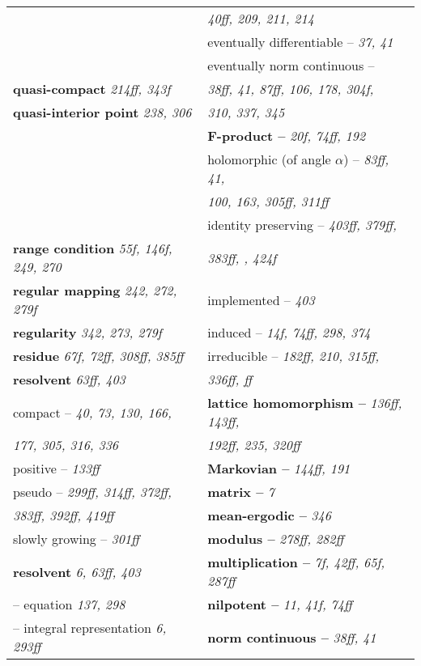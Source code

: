 \begin{longtable}{p{}p{}}
& \quad\quad \textit{40ff, 209, 211, 214} \\
& \quad eventually differentiable -- \textit{37, 41} \\
& \quad eventually norm continuous -- \\
\textbf{quasi-compact} \textit{214ff, 343f} & \quad\quad \textit{38ff, 41, 87ff, 106, 178, 304f,} \\
\textbf{quasi-interior point} \textit{238, 306} & \quad\quad \textit{310, 337, 345} \\
& \textbf{F-product --} \textit{20f, 74ff, 192} \\
& \quad holomorphic (of angle $ \alpha $) -- \textit{83ff, 41,} \\
& \quad\quad \textit{100, 163, 305ff, 311ff} \\
& \quad identity preserving -- \textit{403ff, 379ff,} \\
\textbf{range condition} \textit{55f, 146f, 249, 270} & \quad\quad \textit{383ff, , 424f} \\
\textbf{regular mapping} \textit{242, 272, 279f} & \quad implemented -- \textit{403} \\
\textbf{regularity} \textit{342, 273, 279f} & \quad induced -- \textit{14f, 74ff, 298, 374} \\
\textbf{residue} \textit{67f, 72ff, 308ff, 385ff} & \quad irreducible -- \textit{182ff, 210, 315ff,} \\
\textbf{resolvent} \textit{63ff, 403} & \quad\quad \textit{336ff, ff} \\
\quad compact -- \textit{40, 73, 130, 166,} & \textbf{lattice homomorphism --} \textit{136ff, 143ff,} \\
\quad\quad \textit{177, 305, 316, 336} & \quad\quad \textit{192ff, 235, 320ff} \\
\quad positive -- \textit{133ff} & \textbf{Markovian --} \textit{144ff, 191} \\
\quad pseudo -- \textit{299ff, 314ff, 372ff,} & \textbf{matrix --} \textit{7} \\
\quad\quad \textit{383ff, 392ff, 419ff} & \textbf{mean-ergodic --} \textit{346} \\
\quad slowly growing -- \textit{301ff} & \textbf{modulus --} \textit{278ff, 282ff} \\
\textbf{resolvent} \textit{6, 63ff, 403} & \textbf{multiplication --} \textit{7f, 42ff, 65f, 287ff} \\
\quad -- equation \textit{137, 298} & \textbf{nilpotent --} \textit{11, 41f, 74ff} \\
\quad -- integral representation \textit{6, 293ff} & \textbf{norm continuous --} \textit{38ff, 41} \\

\end{longtable}
